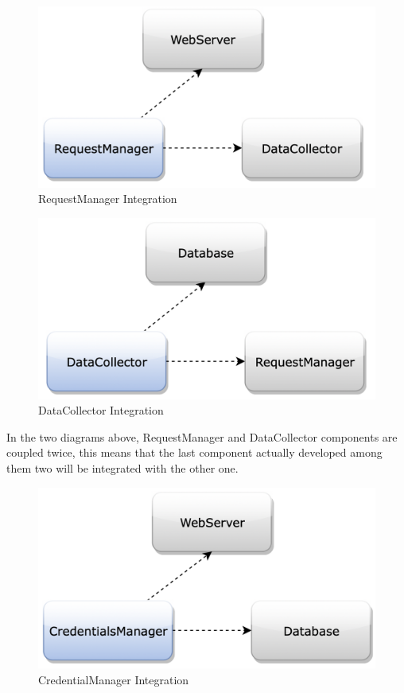 \begin{figure}[H]
\centering
\includegraphics[scale=0.35]{Images/IntegrationPlanImages/fig1.png}
\caption{RequestManager Integration}
\end{figure}

\begin{figure}[H]
\centering
\includegraphics[scale=0.35]{Images/IntegrationPlanImages/fig2.png}
\caption{DataCollector Integration}
\end{figure}

\noindent
In the two diagrams above, RequestManager and DataCollector components are coupled twice, this means that the last component actually developed among them two will be integrated with the other one.

\begin{figure}[H]
\centering
\includegraphics[scale=0.35]{Images/IntegrationPlanImages/fig3.png}
\caption{CredentialManager Integration}
\end{figure}

